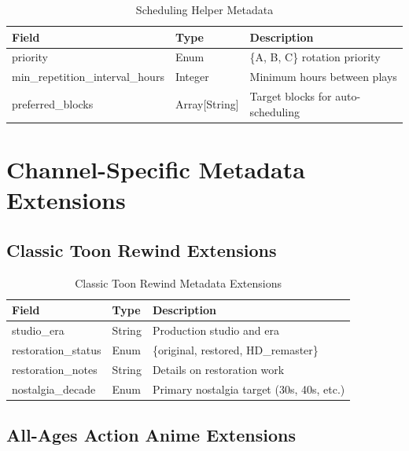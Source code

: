 \documentclass[12pt,letterpaper,twoside]{report}
\begin{document}
\begin{table}[H]
\centering
\caption{Scheduling Helper Metadata}
\label{tab:meta-scheduling}
\begin{tabular}{@{}L{5cm}L{2.5cm}L{6cm}@{}}
\toprule
\textbf{Field} & \textbf{Type} & \textbf{Description} \\
\midrule
priority & Enum & \{A, B, C\} rotation priority \\
min\_\allowbreak repetition\_\allowbreak interval\_\allowbreak hours & Integer & Minimum hours between plays \\
preferred\_\allowbreak blocks & Array[String] & Target blocks for auto-scheduling \\
\bottomrule
\end{tabular}
\end{table}

\section{Channel-Specific Metadata Extensions}

\subsection{Classic Toon Rewind Extensions}

\begin{table}[H]
\centering
\caption{Classic Toon Rewind Metadata Extensions}
\begin{tabular}{@{}L{4cm}L{3cm}L{6.5cm}@{}}
\toprule
\textbf{Field} & \textbf{Type} & \textbf{Description} \\
\midrule
studio\_\allowbreak era & String & Production studio and era \\
restoration\_\allowbreak status & Enum & \{original, restored, HD\_\allowbreak remaster\} \\
restoration\_\allowbreak notes & String & Details on restoration work \\
nostalgia\_\allowbreak decade & Enum & Primary nostalgia target (30s, 40s, etc.) \\
\bottomrule
\end{tabular}
\end{table}

\subsection{All-Ages Action Anime Extensions}
\end{document}
